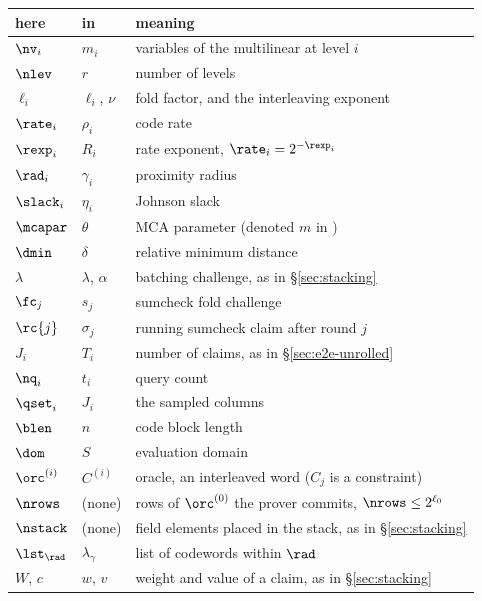 \begin{center}\small
\begin{tabular}{@{}lll@{}}
\hline
here & in \cite{ACFY25,NA25,BCHKS25} & meaning\\
\hline
$\nv_i$        & $m_i$        & variables of the multilinear at level $i$\\
$\nlev$        & $r$          & number of levels\\
$\ell_i$       & $\ell_i$, $\nu$ & fold factor, and the interleaving exponent\\
$\rate_i$      & $\rho_i$     & code rate\\
$\rexp_i$      & $R_i$        & rate exponent, $\rate_i=2^{-\rexp_i}$\\
$\rad_i$       & $\gamma_i$   & proximity radius\\
$\slack_i$     & $\eta_i$     & Johnson slack\\
$\mcapar$      & $\theta$     & MCA parameter (denoted $m$ in \cite{BCHKS25})\\
$\dmin$        & $\delta$     & relative minimum distance\\
$\lambda$      & $\lambda$, $\alpha$ & batching challenge, as in \S\ref{sec:stacking}\\
$\fc_j$        & $s_j$        & sumcheck fold challenge\\
$\rc{j}$       & $\sigma_j$   & running sumcheck claim after round $j$\\
$J_i$          & $T_i$        & number of claims, as in \S\ref{sec:e2e-unrolled}\\
$\nq_i$        & $t_i$        & query count\\
$\qset_i$      & $J_i$        & the sampled columns\\
$\blen$        & $n$          & code block length\\
$\dom$         & $S$          & evaluation domain\\
$\orc^{(i)}$   & $C^{(i)}$    & oracle, an interleaved word ($C_j$ is a constraint)\\
$\nrows$       & (none)       & rows of $\orc^{(0)}$ the prover commits, $\nrows \le 2^{\ell_0}$\\
$\nstack$      & (none)       & field elements placed in the stack, as in \S\ref{sec:stacking}\\
$\lst_{\rad}$  & $\lambda_\gamma$ & list of codewords within $\rad$\\
$W$, $c$       & $w$, $v$     & weight and value of a claim, as in \S\ref{sec:stacking}\\

\end{tabular}
\end{center}
